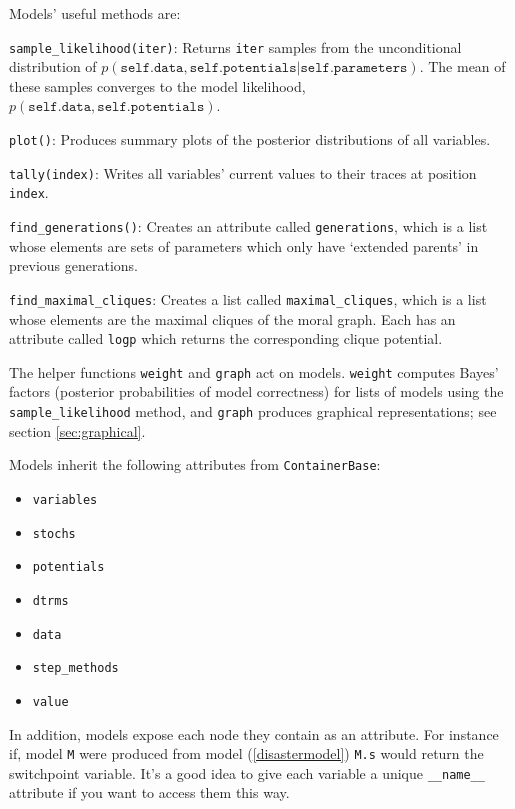 Models' useful methods are:
\begin{description}
    \item \texttt{sample\_likelihood(iter)}: Returns \texttt{iter} samples from the unconditional distribution of $p(\mathtt{self.data, self.potentials}|\mathtt{self.parameters})$. The mean of these samples converges to the model likelihood, $p(\mathtt{self.data, self.potentials})$.
    \item \texttt{plot()}: Produces summary plots of the posterior distributions of all variables.
    \item \texttt{tally(index)}: Writes all variables' current values to their traces at position \texttt{index}.
    \item \texttt{find\_generations()}: Creates an attribute called \texttt{generations}, which is a list whose elements are sets of parameters which only have `extended parents' in previous generations.
    \item \texttt{find\_maximal\_cliques}: Creates a list called \texttt{maximal_cliques}, which is a list whose elements are the maximal cliques of the moral graph. Each has an attribute called \texttt{logp} which returns the corresponding clique potential.
\end{description}

The helper functions \texttt{weight} and \texttt{graph} act on models. \texttt{weight} computes Bayes' factors (posterior probabilities of model correctness) for lists of models using the \texttt{sample\_likelihood} method, and \texttt{graph} produces graphical representations; see section \ref{sec:graphical}.

Models inherit the following attributes from \texttt{ContainerBase}:
\begin{itemize}
    \item \texttt{variables}
    \item \texttt{stochs}
    \item \texttt{potentials}
    \item \texttt{dtrms}
    \item \texttt{data}
    \item \texttt{step_methods}
    \item \texttt{value}
\end{itemize}
In addition, models expose each node they contain as an attribute. For instance if, model \texttt{M} were produced from model (\ref{disastermodel}) \texttt{M.s} would return the switchpoint variable. It's a good idea to give each variable a unique \texttt{\_\_name\_\_} attribute if you want to access them this way.


